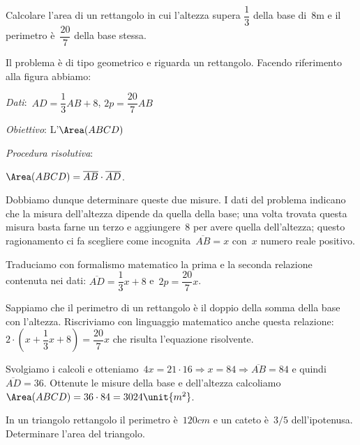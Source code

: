 \begin{problema}
 Calcolare l'area di un rettangolo in cui
l'altezza supera \(\dfrac{1}{3}\) della base di~8m e il
perimetro è~\(\dfrac{20}{7}\) della base stessa.
\end{problema}

 Il problema è di tipo geometrico e riguarda un rettangolo. Facendo riferimento 
alla figura abbiamo:
\begin{multicols}{2}
\emph{Dati}:~\(AD=\dfrac{1}{3}AB+8\), \quad \(2p=\dfrac{20}{7}AB\)

\emph{Obiettivo}: L'\(\Area (ABCD)\)

\emph{Procedura risolutiva}:

\hspace{10mm}
\(\Area (ABCD)=\overline{AB} \cdot \overline{AD}\).

\begin{center}
%  
\rettangolo
\end{center}
\end{multicols}

Dobbiamo dunque determinare queste due misure. I dati del problema
indicano che la misura dell'altezza dipende da quella
della base; una volta trovata questa misura basta farne un terzo e
aggiungere~8 per avere quella dell'altezza; questo
ragionamento ci fa scegliere come incognita~\(\overline{AB}=x\)
con~\(x\) numero reale positivo.

Traduciamo con formalismo matematico la prima e la seconda relazione
contenuta nei dati:
\(\overline{AD}=\dfrac{1}{3}x+8\) e~\(2p=\dfrac{20}{7}x\).

Sappiamo che il perimetro di un rettangolo è il doppio della somma
della base con l'altezza. Riscriviamo con linguaggio
matematico anche questa relazione:~\(2\cdot 
\left(x+\dfrac{1}{3}x+8\right)=\dfrac{20}{7}x\)
che risulta l'equazione risolvente.

Svolgiamo i calcoli e otteniamo~\(4x=21\cdot 16\Rightarrow 
x=84\Rightarrow\overline{AB}=84\) e quindi~\(\overline{AD}=36\).
Ottenute le misure della base e dell'altezza calcoliamo~\(\Area (ABCD)=36\cdot 
84=3024\unit{{m}^{2}}\).

\begin{problema}
In un triangolo rettangolo il perimetro è~\(120\unit{cm}\) e un cateto 
è~\(3/5\) dell'ipotenusa. Determinare l'area del triangolo.
\end{problema}

